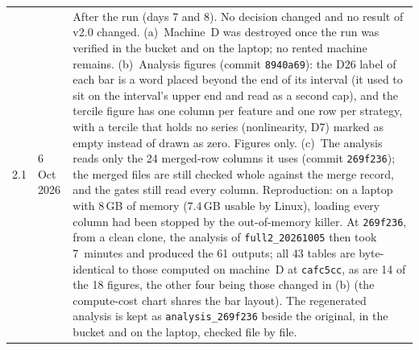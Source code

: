 \documentclass[11pt,a4paper]{article}
\newcommand{\code}[1]{\texttt{#1}}
\begin{document}
\begin{longtable}{@{}p{1.3cm} p{1.9cm} p{11.8cm}@{}}
2.1 & 6 Oct 2026 & After the run (days 7 and 8). No decision changed and no result of v2.0 changed. (a)~Machine~D was destroyed once the run was verified in the bucket and on the laptop; no rented machine remains. (b)~Analysis figures (commit \code{8940a69}): the D26 label of each bar is a word placed beyond the end of its interval (it used to sit on the interval's upper end and read as a second cap), and the tercile figure has one column per feature and one row per strategy, with a tercile that holds no series (nonlinearity, D7) marked as empty instead of drawn as zero. Figures only. (c)~The analysis reads only the 24 merged-row columns it uses (commit \code{269f236}); the merged files are still checked whole against the merge record, and the gates still read every column. Reproduction: on a laptop with 8\,GB of memory (7.4\,GB usable by Linux), loading every column had been stopped by the out-of-memory killer. At \code{269f236}, from a clean clone, the analysis of \mbox{\code{full2_20261005}} then took 7~minutes and produced the 61 outputs; all 43 tables are byte-identical to those computed on machine~D at \code{cafc5cc}, as are 14 of the 18 figures, the other four being those changed in (b) (the compute-cost chart shares the bar layout). The regenerated analysis is kept as \mbox{\code{analysis_269f236}} beside the original, in the bucket and on the laptop, checked file by file. \\

\end{longtable}
\end{document}
